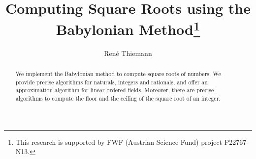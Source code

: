\documentclass[11pt,a4paper]{article}
\begin{document}
\title{Computing Square Roots using the Babylonian Method\thanks{This research is supported by FWF (Austrian Science Fund) project P22767-N13.}}
\author{Ren\'e Thiemann}
\maketitle

\begin{abstract}
  We implement the Babylonian method \cite{Babylon} to compute square roots of numbers.
  We provide precise algorithms for naturals, integers and rationals, and
  offer an approximation algorithm for linear ordered fields. Moreover, there
  are precise algorithms to compute the floor and the ceiling of the square root of an integer.
\end{abstract}

\tableofcontents








\end{document}
